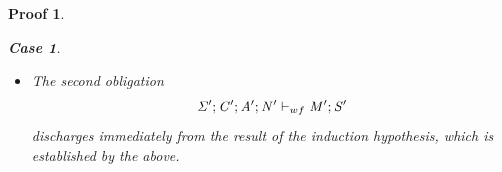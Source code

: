 \documentclass[showabstract,showacknowledgments,showpreface,showdedication]{iuphd}
\newtheorem*{bcase}{Case}
\theoremstyle{nonumberplain}
\newtheorem{nproof}{Proof}
\begin{document}
\begin{nproof}
\begin{bcase}
\begin{itemize}
        \begin{displaymath}
      \begin{aligned}
        \text{For some} \;\; & \SENV' \supseteq \SENV, \CENV' \supseteq \CENV ,\\
        & \emptytenv;\SENV';\CENV';\AENV';\NENV' \vdash \AENV'';\NENV'';\EXPR_1' : \tyatlocreg{\TYP_1}{\loc_1}{\reg_1} \\
        \text{and} \;\; & \storewf{\SENV'}{\CENV'}{\AENV'}{\NENV'}{\MENV'}{\STOR'}.
      \end{aligned}
    \end{displaymath}
    By inversion on \tlet{}, we also have that
    \begin{align*}
    \TENV';\SENV';\CENV;\AENV';\NENV' \vdash \AENV'';\NENV'';\EXPR_2 : \tyatlocreg{\TYP_2}{\loc_2}{\reg_2},
    \end{align*}
    where
    \begin{align*}
    \TENV' &= \set{\var \mapsto \tyatlocreg{\TYP_1}{\loc_1}{\reg_1}} \\
    \SENV' &= \set{\locreg{\loc_1}{\reg_1} \mapsto \TYP_1}.
    \end{align*}
    By inspection on \tlet{} and the previous two typing judgements, that is, for $\EXPR_1'$
    and $\EXPR_2$, we discharge this case.
    \item The second obligation
    \begin{displaymath}
    \mathit{\Sigma}';\mathit{C}';\mathit{A}';\mathit{N}' \vdash_{wf} \mathit{M}';\mathit{S}'
    \end{displaymath}
    discharges immediately from the result of the induction hypothesis, which is
    established by the above.
    \end{itemize}
  \end{bcase}


\end{nproof}
\end{document}
